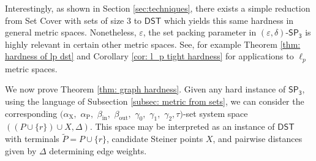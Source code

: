 \documentclass{theoretics}
\newcommand{\1}{\textbf{1}}
\newcommand{\setpT}{$\mathsf{SP_3}$\xspace}
\newcommand{\dst}{$\mathsf{DST}$\xspace}
\newcommand{\td}{\tau}
\newcommand{\srd}{\alpha_{\text{X}}}
\newcommand{\trd}{\alpha_{\text{P}}}
\renewcommand{\tilde}{\widetilde}
\begin{document}
\begin{remark}
Interestingly, as shown in Section \ref{sec:techniques}, there exists a simple reduction from Set Cover with sets of size $3$ to \dst which yields this same hardness in general metric spaces. Nonetheless, $\varepsilon$, the set packing parameter in $(\varepsilon, \delta)$-\setpT is highly relevant in certain other metric spaces. See, for example Theorem \ref{thm: hardness of lp dst} and Corollary \ref{cor: l_p tight hardness} for applications to $\ell_p$ metric spaces.
\end{remark}



We now prove Theorem \ref{thm: graph hardness}. Given any hard instance of \setpT, using the language of Subsection \ref{subsec: metric from sets}, we can consider the corresponding $(\srd,$ $\trd,$ $\beta_{\text{in}},$ $\beta_{\text{out}},$ $\gamma_0,$ $\gamma_1,$ $\gamma_2,\td)$-set system space $((P \cup \{r\})\cup X, \Delta)$. This space may be interpreted as an instance of \dst with terminals $\tilde{P} = P \cup \{r\}$, candidate Steiner points $X$, and pairwise distances given by $\Delta$ determining edge weights. 
\end{document}
